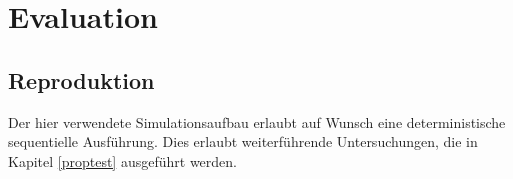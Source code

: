 \chapter{Evaluation}

\section{Reproduktion}
\label{reproduktion}

Der hier verwendete Simulationsaufbau erlaubt auf Wunsch eine deterministische sequentielle Ausführung. Dies erlaubt weiterführende Untersuchungen, die in Kapitel \ref{proptest} ausgeführt werden.




